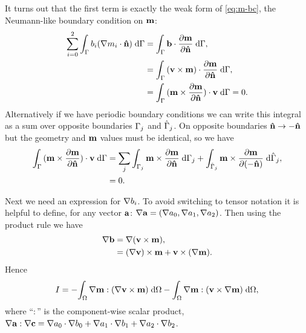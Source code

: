 It turns out that the first term is exactly the weak form of \cref{eq:m-bc}, the Neumann-like boundary condition on $\mv$:
\begin{equation}
  \begin{aligned}
    \sum_{i=0}^2 \intb{b_i (\grad m_i \cdot \nv)} 
    &= \intb{\bv \cdot \pd{\mv}{\nv}}, \\
    &=  \intb{(\testv \times \mv) \cdot \pd{\mv}{\nv}}, \\
    &=  \intb{(\mv \times \pd{\mv}{\nv}) \cdot \testv} = 0 .
  \end{aligned}
\end{equation}
Alternatively if we have periodic boundary conditions we can write this integral as a sum over opposite boundaries $\boundd_j$ and $\hat{\boundd}_j$.
On opposite boundaries $\nv \rightarrow -\nv$ but the geometry and $\mv$ values must be identical, so we have
\begin{equation}
  \begin{aligned}
    \intb{(\mv \times \pd{\mv}{\nv}) \cdot \testv}
    &= \sum_j \intd[\boundd_j]{\mv \times \pd{\mv}{\nv}} 
    + \intd[\hat{\boundd}_j]{\mv \times \pd{\mv}{(-\nv)}}, \\
    & = 0.
  \end{aligned}
\end{equation}

Next we need an expression for $\grad b_i$.
To avoid switching to tensor notation it is helpful to define, for any vector $\av$: $\grad \av = (\grad a_0, \grad a_1, \grad a_2)$.
Then using the product rule we have
\begin{equation}
  \begin{aligned}
    \grad \bv &= \grad \bigb{\testv \times \mv}, \\
    & = (\grad \testv) \times \mv + \testv \times (\grad \mv).
  \end{aligned}
\end{equation}
Hence
\begin{equation}
  I = - \intd{\grad \mv : \bigb{\grad \testv \times \mv}} 
      - \intd{\grad \mv : \bigb{\testv \times \grad \mv}},
      \label{eq:72}
\end{equation}
where ``$:$'' is the component-wise scalar product, \eg $\grad \av : \grad \cv = \grad a_0 \cdot \grad b_0 + \grad a_1 \cdot \grad b_1 + \grad a_2 \cdot \grad b_2$.

